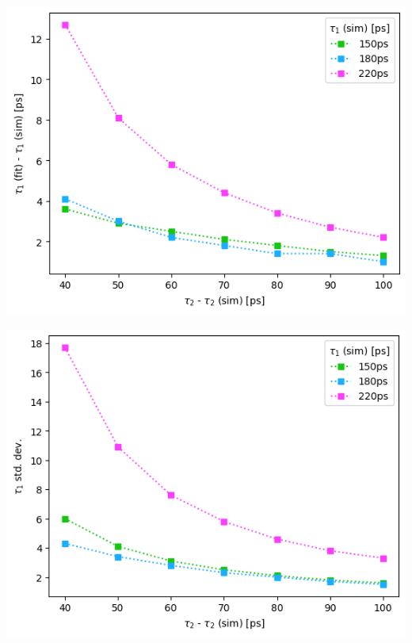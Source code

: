 \begin{minipage}{.47\linewidth}
    \centering
    \includegraphics[width=\linewidth]{Batch 3/regular IRF/t1-diff 5050.png}
    \label{fig:comp-t1-5050}
\end{minipage}
\hfill
\begin{minipage}{.47\linewidth}
    \centering
    \includegraphics[width=\linewidth]{Batch 3/regular IRF/t1-err 5050.png}
    \label{fig:comp-t1err-5050}
\end{minipage}
